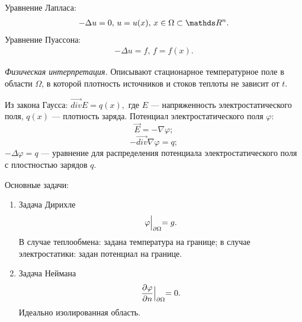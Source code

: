 Уравнение Лапласа: \begin{align}-\Delta u = 0, \, u = u(x), \, x \in \Omega \subset \real^n.\label{Laplace}\end{align}
Уравнение Пуассона: \begin{align}-\Delta u = f, \, f = f(x).\label{Poisson}\end{align}

{\itshape Физическая интерпретация.} Описывают стационарное температурное поле в области $\Omega$, в которой плотность источников и стоков теплоты не зависит от $t$.

Из закона Гаусса: $\overrightarrow{div}E = q(x),$ где $E$ --- напряженность электростатического поля, $q(x)$ --- плотность заряда.
Потенциал электростатического поля $\varphi:$
$$\stackrel{\rightarrow} E = -\nabla \varphi;$$
$$-\overrightarrow{div}\nabla\varphi = q;$$
$-\Delta \varphi = q$  --- уравнение для распределения потенциала электростатического поля с плостностью зарядов $ q.$

Основные задачи:
\begin{enumerate}
\item Задача Дирихле
$$\varphi \Bigl|_{\partial\Omega} = g.$$
В случае теплообмена: задана температура на границе; в случае электростатики: задан потенциал на границе.
\item Задача Неймана
$$\dfrac{\partial\varphi}{\partial n}\Bigl|_{\partial\Omega}=0.$$
Идеально изолированная область.
\end{enumerate}
